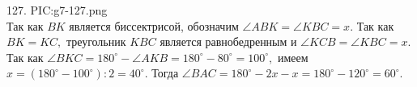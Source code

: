 127. {{PIC:g7-127.png}}\\
Так как $BK$ является биссектрисой, обозначим $\angle ABK=\angle KBC=x.$ Так как $BK=KC,$ треугольник $KBC$ является равнобедренным и $\angle KCB=\angle KBC=x.$ Так как $\angle BKC=180^\circ-\angle AKB=180^\circ-80^\circ=100^\circ,$ имеем $x=(180^\circ-100^\circ):2=40^\circ.$ Тогда $\angle BAC=180^\circ-2x-x=180^\circ-120^\circ=60^\circ.$\\
